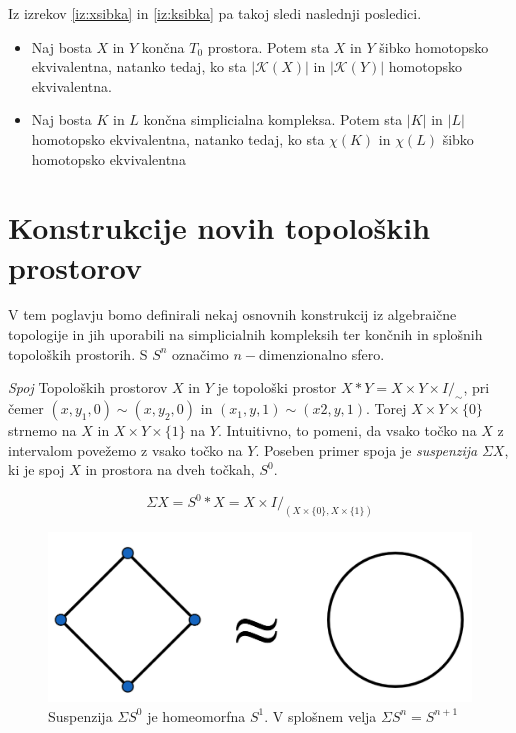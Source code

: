 \documentclass[mat1]{fmfdelo}
\DeclareRobustCommand{\k}{
    \mathcal{K}
}
\begin{document}
Iz izrekov \ref{iz:xsibka} in \ref{iz:ksibka} pa takoj sledi naslednji posledici.

\begin{posledica}
    \begin{itemize}

        \item Naj bosta $X$ in $Y$ končna $T_0$ prostora. Potem sta $X$ in $Y$ šibko homotopsko ekvivalentna, natanko tedaj, ko sta $|\k(X)|$ in $|\k(Y)|$ homotopsko ekvivalentna.
        \item Naj bosta $K$ in $L$ končna simplicialna kompleksa. Potem sta $|K|$ in $|L|$ homotopsko ekvivalentna, natanko tedaj, ko sta $\chi(K)$ in $\chi(L)$ šibko homotopsko ekvivalentna
    \end{itemize}
\end{posledica}

\section{Konstrukcije novih topoloških prostorov}


V tem poglavju bomo definirali nekaj osnovnih konstrukcij iz algebraične topologije in jih uporabili na simplicialnih kompleksih ter končnih in splošnih topoloških prostorih. S $S^n$ označimo $n-$dimenzionalno sfero.

\textit{Spoj} Topoloških prostorov $X$ in $Y$ je topološki prostor $X\ast Y = X\times Y 
\times I /_{\sim}$, pri čemer $(x, y_1, 0) \sim (x, y_2, 0)$ in  $(x_1, y, 1) \sim (x2, y, 1)$. 
Torej $X\times Y\times \{0\}$ strnemo na $X$ in $X\times Y\times \{1\}$ na $Y$. Intuitivno, 
to pomeni, da vsako točko na $X$ z intervalom povežemo z vsako točko na $Y$.
Poseben primer spoja je \textit{suspenzija} $\Sigma X$, ki je spoj $X$ in prostora na dveh točkah, $S^0$.

$$
\Sigma X=S^0\ast X = X\times I /_{(X\times \{0\},X\times \{1\})}
$$

\begin{figure}[h]
    \centering
    \includegraphics[width=0.6\linewidth]{homeo2.png}
    \caption{Suspenzija $\Sigma S^0$ je homeomorfna $S^1$. V splošnem velja $\Sigma S^n=S^{n+1}$}
\end{figure}
\end{document}
